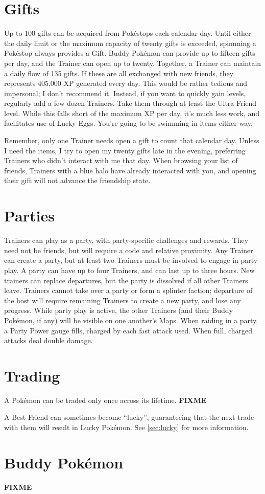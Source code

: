\section{Gifts}
\label{sec:gifts}
Up to 100 gifts can be acquired from Pokéstops each calendar day.
Until either the daily limit or the maximum capacity of twenty gifts
 is exceeded, spinnning a Pokéstop always provides a Gift.
Buddy Pokémon can provide up to fifteen gifts per day,
  and the Trainer can open up to twenty.
Together, a Trainer can maintain a daily flow of 135 gifts.
If these are all exchanged with new friends, they represents 405,000 XP generated every day.
This would be rather tedious and impersonal; I don't recommend it.
Instead, if you want to quickly gain levels, regularly add a few dozen Trainers.
Take them through at least the Ultra Friend level.
While this falls short of the maximum XP per day, it's much less work, and facilitates use of Lucky Eggs.
You're going to be swimming in items either way.

Remember, only one Trainer needs open a gift to count that calendar day.
Unless I need the items, I try to open my twenty gifts late in the evening,
  preferring Trainers who didn't interact with me that day.
When browsing your list of friends, Trainers with a blue halo have already interacted with you,
  and opening their gift will not advance the friendship state.

\section{Parties}
\label{sec:parties}
Trainers can play as a party, with party-specific challenges and rewards.
They need not be friends, but will require a code and relative proximity.
Any Trainer can create a party, but at least two Trainers must be involved to engage in party play.
A party can have up to four Trainers, and can last up to three hours.
New trainers can replace departures, but the party is dissolved if all other Trainers leave.
Trainers cannot take over a party or form a splinter faction; departure of the host will
  require remaining Trainers to create a new party, and lose any progress.
While party play is active, the other Trainers (and their Buddy Pokémon, if any)
  will be visible on one another's Maps.
When raiding in a party, a Party Power gauge fills, charged by each fast attack used.
When full, charged attacks deal double damage.

\section{Trading}
\label{sec:trades}
A Pokémon can be traded only once across its lifetime.
\textbf{FIXME}

A Best Friend can sometimes become ``lucky'', guaranteeing that the next trade with
  them will result in Lucky Pokémon.
See \autoref{sec:lucky} for more information.

\section{Buddy Pokémon}
\label{sec:buddies}
\textbf{FIXME}

